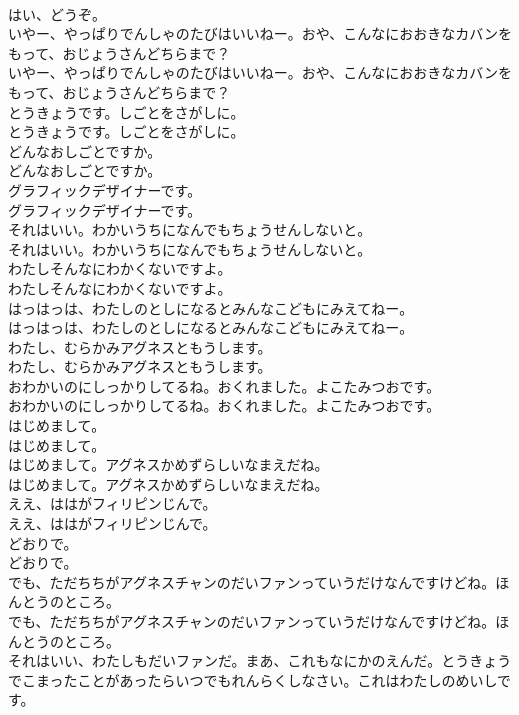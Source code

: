 \documentclass[8pt]{extreport}
\begin{document}
\begin{CJK}{UTF8}{min}
\\	はい、どうぞ。 
\\	いやー、やっぱりでんしゃのたびはいいねー。おや、こんなにおおきなカバンをもって、おじょうさんどちらまで？	
\\	いやー、やっぱりでんしゃのたびはいいねー。おや、こんなにおおきなカバンをもって、おじょうさんどちらまで？ 
\\	とうきょうです。しごとをさがしに。	
\\	とうきょうです。しごとをさがしに。 
\\	どんなおしごとですか。	
\\	どんなおしごとですか。 
\\	グラフィックデザイナーです。	
\\	グラフィックデザイナーです。 
\\	それはいい。わかいうちになんでもちょうせんしないと。	
\\	それはいい。わかいうちになんでもちょうせんしないと。 
\\	わたしそんなにわかくないですよ。	
\\	わたしそんなにわかくないですよ。 
\\	はっはっは、わたしのとしになるとみんなこどもにみえてねー。	
\\	はっはっは、わたしのとしになるとみんなこどもにみえてねー。 
\\	わたし、むらかみアグネスともうします。	
\\	わたし、むらかみアグネスともうします。 
\\	おわかいのにしっかりしてるね。おくれました。よこたみつおです。	
\\	おわかいのにしっかりしてるね。おくれました。よこたみつおです。 
\\	はじめまして。	
\\	はじめまして。 
\\	はじめまして。アグネスかめずらしいなまえだね。	
\\	はじめまして。アグネスかめずらしいなまえだね。 
\\	ええ、ははがフィリピンじんで。	
\\	ええ、ははがフィリピンじんで。 
\\	どおりで。	
\\	どおりで。 
\\	でも、ただちちがアグネスチャンのだいファンっていうだけなんですけどね。ほんとうのところ。	
\\	でも、ただちちがアグネスチャンのだいファンっていうだけなんですけどね。ほんとうのところ。 
\\	それはいい、わたしもだいファンだ。まあ、これもなにかのえんだ。とうきょうでこまったことがあったらいつでもれんらくしなさい。これはわたしのめいしです。	

\end{CJK}
\end{document}
